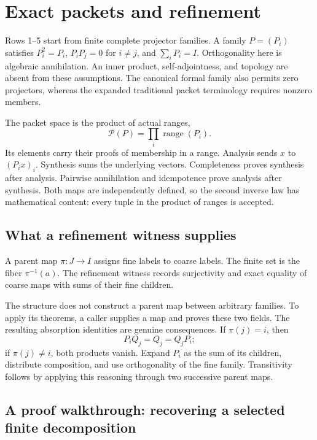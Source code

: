 \section{Exact packets and refinement}\label{sec:refinement}

Rows 1--5 start from finite complete projector families. A family $P=(P_i)$ satisfies $P_i^2=P_i$, $P_iP_j=0$ for $i\ne j$, and $\sum_iP_i=I$. Orthogonality here is algebraic annihilation. An inner product, self-adjointness, and topology are absent from these assumptions. The canonical formal family also permits zero projectors, whereas the expanded traditional packet terminology requires nonzero members.

The packet space is the product of actual ranges,
\[
\mathcal P(P)=\prod_i\operatorname{range}(P_i).
\]
Its elements carry their proofs of membership in a range. Analysis sends $x$ to $(P_i x)_i$. Synthesis sums the underlying vectors. Completeness proves synthesis after analysis. Pairwise annihilation and idempotence prove analysis after synthesis. Both maps are independently defined, so the second inverse law has mathematical content: every tuple in the product of ranges is accepted.

\subsection{What a refinement witness supplies}

A parent map $\pi:J\to I$ assigns fine labels to coarse labels. The finite set  is the fiber $\pi^{-1}(a)$. The refinement witness records surjectivity and exact equality of coarse maps with sums of their fine children.

The structure does not construct a parent map between arbitrary families. To apply its theorems, a caller supplies a map and proves these two fields. The resulting absorption identities are genuine consequences. If $\pi(j)=i$, then
\[
P_iQ_j=Q_j=Q_jP_i;
\]
if $\pi(j)\ne i$, both products vanish. Expand $P_i$ as the sum of its children, distribute composition, and use orthogonality of the fine family. Transitivity follows by applying this reasoning through two successive parent maps.

\subsection{A proof walkthrough: recovering a selected finite decomposition}


